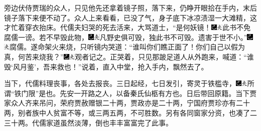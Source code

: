旁边伏侍贾瑞的众人，只见他先还拿着镜子照，落下来，仍睁开眼拾在手内，末后镜子落下来便不动了。众人上来看看，已没了气，身子底下冰凉渍湿一大滩精，这才忙着穿衣抬床。代儒夫妇哭的死去活来，大骂道士，``是何妖镜！{\includegraphics[width=3mm]{../Images/00003}\includegraphics[width=3mm]{../Images/00012}\footnotesize \kaishu 此书不免腐儒一谤。}若不早毁此物，{\includegraphics[width=3mm]{../Images/00003}\includegraphics[width=3mm]{../Images/00012}\footnotesize \kaishu 凡野史俱可毁，独此书不可毁。}遗害于世不小。''{\includegraphics[width=3mm]{../Images/00003}\includegraphics[width=3mm]{../Images/00012}\footnotesize \kaishu 腐儒。}遂命架火来烧，只听镜内哭道：``谁叫你们瞧正面了！你们自己以假为真，何苦来烧我？''{\includegraphics[width=3mm]{../Images/00003}\includegraphics[width=3mm]{../Images/00012}\footnotesize \kaishu 观者记之。}正哭着，只见那跛足道人从外跑来，喊道：``谁毁`风月鉴'，吾来救也！''说着，直入中堂，抢入手内，飘然去了。

当下，代儒料理丧事，各处去报丧。三日起经，七日发引，寄灵于铁槛寺，{\includegraphics[width=3mm]{../Images/00003}\includegraphics[width=3mm]{../Images/00012}\footnotesize \kaishu 所谓``铁门限''是也。先安一开路之人，以备秦氏仙柩有方也。}日后带回原籍。当下贾家众人齐来吊问，荣府贾赦赠银二十两，贾政亦是二十两，宁国府贾珍亦有二十两，别者族中人贫富不等，或三两五两，不可胜数。另有各同窗家分资，也凑了二三十两。代儒家道虽然淡薄，倒也丰丰富富完了此事。

